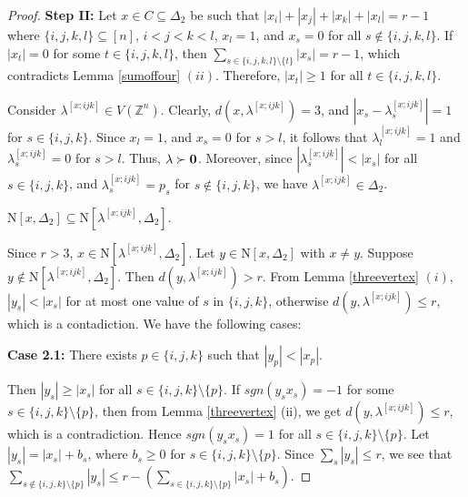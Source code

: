 \documentclass[10pt,a4paper]{amsart}
\def\Z{{\mathbb{Z}}}
\def\n{{\mathrm{N}}}
\newcommand{\D}{\Delta}
\begin{document}
\begin{proof}
    \smallskip
	\noindent \textbf{Step II:}
	Let $x\in C\subseteq \D_2$ be such that $|x_i|+|x_j|+|x_k|+|x_l|=r-1$  where $\{i,j,k,l\}\subseteq [n]$, $i<j<k<l$, $x_l=1$, and $x_s=0$ for all $s\notin \{i,j,k,l\}$. If $|x_t|=0$ for some $t\in \{i,j,k,l\}$, then $\sum_{s\in\{i,j,k,l\}\setminus\{t\}}|x_s|=r-1$, which contradicts Lemma \ref{sumoffour} $(ii)$. Therefore, $|x_t|\geq 1$ for all $t\in \{i,j,k,l\}$.
	
	Consider $\lambda^{[x;ijk]}\in V(\Z^n)$. Clearly, $d(x,\lambda^{[x;ijk]})=3$, and $|x_s-\lambda^{[x;ijk]}_s|=1$ for $s\in\{i,j,k\}$. Since  $x_l=1$, and $x_s=0$ for $s>l$, it follows that $\lambda^{[x;ijk]}_l=1$ and $\lambda^{[x;ijk]}_s=0$ for $s>l$. Thus, $\lambda\succ{\bf{0}}$. Moreover, since $|\lambda^{[x;ijk]}_s|<|x_s|$ for all $s\in\{i,j,k\}$, and $\lambda^{[x;ijk]}_s=p_s$ for $s\notin\{i,j,k\}$, we have $\lambda^{[x;ijk]}\in\D_2$.
    
	\vspace{-0.5 cm}
    
	\begin{claim}\label{claim:fourvertex2}
		$\n[x, \D_2] \subseteq \n[\lambda^{[x;ijk]}, \D_2]$.
	\end{claim}
    
    \vspace{-0.5 cm}
    
	Since $r > 3$, $x\in\n[\lambda^{[x;ijk]}, \D_2]$. Let $y\in\n[x,\D_2]$ with $x\neq y$. Suppose $y\notin \n[\lambda^{[x;ijk]},\D_2]$. Then $d(y,\lambda^{[x;ijk]})>r$. From Lemma \ref{threevertex} $(i)$, $|y_s|<|x_s|$ for at most one value of $s$ in  $\{i,j,k\}$, otherwise $d(y,\lambda^{[x;ijk]})\leq r$, which is a contadiction. We have the following cases:
	
	
    \smallskip
	\noindent \textbf{Case 2.1:} There exists $p \in \{i, j, k\}$ such that $|y_p| < |x_p|$. 
	
	
	Then  $|y_s|\geq |x_s|$  for all $s\in \{i ,j,k\}\setminus \{p\}$. If  $sgn(y_sx_s)=-1$ for some $s \in \{i, j, k\} \setminus \{p\}$, then from Lemma \ref{threevertex} (ii), we get $d(y,\lambda^{[x;ijk]})\leq r$,  which is a contradiction. Hence $sgn(y_sx_s)=1$ for all $s \in \{i, j, k\} \setminus \{p\}$. Let $|y_s|=|x_s|+b_s$, where $b_s\geq 0$ for $s \in \{i, j, k\} \setminus \{p\}$.  Since $\sum_{s}|y_s|\leq r$, we see that $\sum_{s\notin \{i, j,k\} \setminus \{p\}}|y_s|\leq r-(\sum_{s \in \{i, j, k \} \setminus \{p\}}|x_s|+b_s)$.
	

\end{proof}
\end{document}
